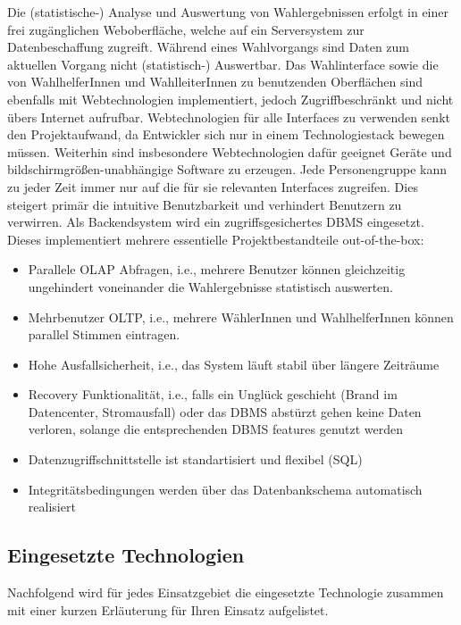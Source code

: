 \documentclass[a4paper,12pt]{article}
\begin{document}
Die (statistische-) Analyse und Auswertung von Wahlergebnissen erfolgt in einer frei zugänglichen
Weboberfläche, welche auf ein Serversystem zur Datenbeschaffung zugreift. 
Während eines Wahlvorgangs sind Daten zum aktuellen Vorgang nicht (statistisch-) Auswertbar.
%
Das Wahlinterface sowie die von WahlhelferInnen und WahlleiterInnen zu benutzenden Oberflächen sind 
ebenfalls mit Webtechnologien implementiert, jedoch Zugriffbeschränkt und nicht übers Internet aufrufbar.
%
Webtechnologien für alle Interfaces zu verwenden senkt den Projektaufwand, da Entwickler sich nur in 
einem Technologiestack bewegen müssen. Weiterhin sind insbesondere Webtechnologien dafür geeignet
Geräte und bildschirmgrößen-unabhängige Software zu erzeugen.
%
Jede Personengruppe kann zu jeder Zeit immer nur auf die für sie relevanten Interfaces zugreifen.
Dies steigert primär die intuitive Benutzbarkeit und verhindert Benutzern zu verwirren. 
%
Als Backendsystem wird ein zugriffsgesichertes DBMS eingesetzt. Dieses implementiert mehrere 
essentielle Projektbestandteile out-of-the-box:

\begin{itemize}
      \item Parallele OLAP Abfragen, i.e., mehrere Benutzer können gleichzeitig ungehindert voneinander 
            die Wahlergebnisse statistisch auswerten.
      \item Mehrbenutzer OLTP, i.e., mehrere WählerInnen und WahlhelferInnen können parallel Stimmen
            eintragen.
      \item Hohe Ausfallsicherheit, i.e., das System läuft stabil über längere Zeiträume
      \item Recovery Funktionalität, i.e., falls ein Unglück geschieht (Brand im Datencenter, Stromausfall) 
            oder das DBMS abstürzt gehen keine Daten verloren, solange die entsprechenden DBMS features 
            genutzt werden
      \item Datenzugriffschnittstelle ist standartisiert und flexibel (SQL)
      \item Integritätsbedingungen werden über das Datenbankschema automatisch realisiert
\end{itemize}

\subsection{Eingesetzte Technologien}
Nachfolgend wird für jedes Einsatzgebiet die eingesetzte Technologie zusammen mit einer kurzen Erläuterung
für Ihren Einsatz aufgelistet.
\end{document}
